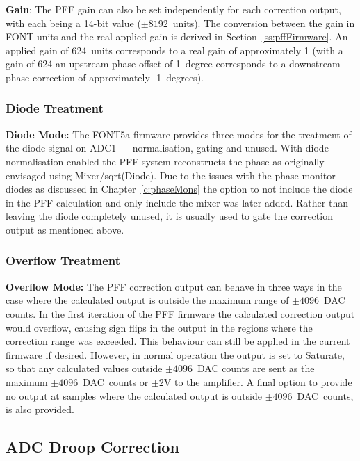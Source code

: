 \textbf{Gain}: The PFF gain can also be set independently for each correction output, with each being a 14-bit value (\(\pm8192\)~units). The conversion between the gain in FONT units and the real applied gain is derived in Section~\ref{ss:pffFirmware}. An applied gain of 624~units corresponds to a real gain of approximately 1 (with a gain of 624 an upstream phase offset of 1~degree corresponds to a downstream phase correction of approximately -1~degrees).

\subsubsection{Diode Treatment}

\textbf{Diode Mode:} The FONT5a firmware provides three modes for the treatment of the diode signal on ADC1 --- normalisation, gating and unused. With diode normalisation enabled the PFF system reconstructs the phase as originally envisaged using Mixer/sqrt(Diode). Due to the issues with the phase monitor diodes as discussed in Chapter~\ref{c:phaseMons} the option to not include the diode in the PFF calculation and only include the mixer was later added. Rather than leaving the diode completely unused, it is usually used to gate the correction output as mentioned above.

\subsubsection{Overflow Treatment}

\textbf{Overflow Mode:} The PFF correction output can behave in three ways in the case where the calculated output is outside the maximum range of \(\pm4096\)~DAC counts. In the first iteration of the PFF firmware the calculated correction output would overflow, causing sign flips in the output in the regions where the correction range was exceeded. This behaviour can still be applied in the current firmware if desired. However, in normal operation the output is set to Saturate, so that any calculated values outside \(\pm4096\)~DAC counts are sent as the maximum \(\pm4096\)~DAC~counts or \(\pm2\)V to the amplifier. A final option to provide no output at samples where the calculated output is outside \(\pm4096\)~DAC~counts, is also provided.


\subsection{ADC Droop Correction}
\label{ss:droopCorr}

